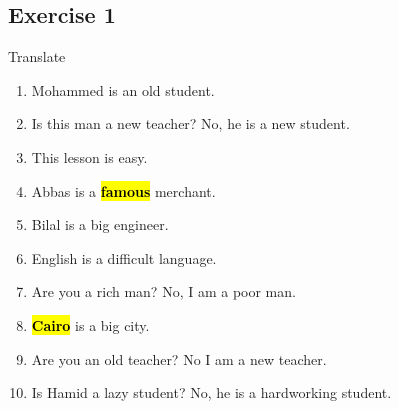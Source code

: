 \subsection{Exercise 1}
Translate
\begin{enumerate}
    \item Mohammed is an old student. \\[0.1in] \answerline 
    \item Is this man a new teacher? No, he is a new student. \\[0.1in] \answerline 
    \item This lesson is easy. \\[0.1in] \answerline 
    \item Abbas is a \hl{\textbf{famous}} merchant.  \\[0.1in] \answerline 
    \item Bilal is a big engineer. \\[0.1in] \answerline 
    \item English is a difficult language. \\[0.1in] \answerline 
    \item Are you a rich man? No, I am a poor man.  \\[0.1in] \answerline 
    \item \hl{\textbf{Cairo}} is a big city.  \\[0.1in] \answerline
    \item Are you an old teacher? No I am a new teacher. \\[0.1in] \answerline
    \item Is Hamid a lazy student? No, he is a hardworking student.  \\[0.1in] \answerline
    
\end{enumerate}

